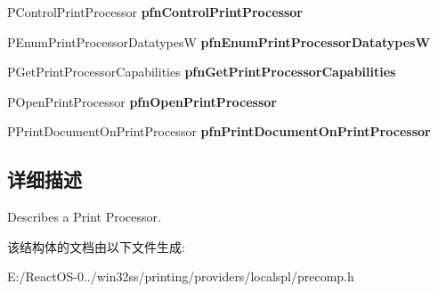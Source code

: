 \begin{DoxyCompactItemize}
P\+Control\+Print\+Processor {\bfseries pfn\+Control\+Print\+Processor}
\item 
\mbox{\label{struct___l_o_c_a_l___p_r_i_n_t___p_r_o_c_e_s_s_o_r_a12368ed4e610b315cdda5918c54f1e5a}} 
P\+Enum\+Print\+Processor\+DatatypesW {\bfseries pfn\+Enum\+Print\+Processor\+DatatypesW}
\item 
\mbox{\label{struct___l_o_c_a_l___p_r_i_n_t___p_r_o_c_e_s_s_o_r_a4799597ec3fe0421ffd96c12360a2d63}} 
P\+Get\+Print\+Processor\+Capabilities {\bfseries pfn\+Get\+Print\+Processor\+Capabilities}
\item 
\mbox{\label{struct___l_o_c_a_l___p_r_i_n_t___p_r_o_c_e_s_s_o_r_adfd02ccb38e8eac3d68984390ae956b9}} 
P\+Open\+Print\+Processor {\bfseries pfn\+Open\+Print\+Processor}
\item 
\mbox{\label{struct___l_o_c_a_l___p_r_i_n_t___p_r_o_c_e_s_s_o_r_ab6c334f077139f8e694aef03a35c33e5}} 
P\+Print\+Document\+On\+Print\+Processor {\bfseries pfn\+Print\+Document\+On\+Print\+Processor}
\end{DoxyCompactItemize}


\subsection{详细描述}
Describes a Print Processor. 

该结构体的文档由以下文件生成\+:\begin{DoxyCompactItemize}
\item 
E\+:/\+React\+O\+S-\/0../win32ss/printing/providers/localspl/precomp.\+h\end{DoxyCompactItemize}
